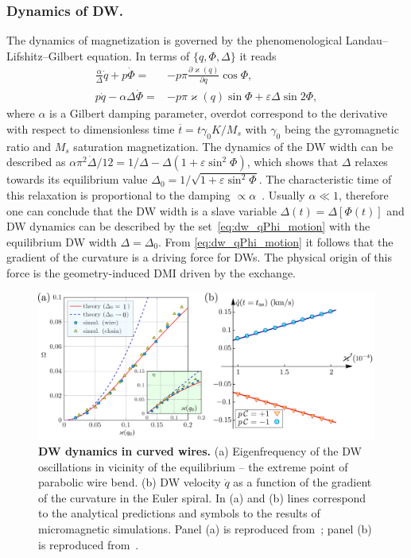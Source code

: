 \documentclass[runningheads]{llncs}
\begin{document}
\subsubsection{Dynamics of DW.} The dynamics of magnetization is governed by the phenomenological Landau--Lifshitz--Gilbert equation. In terms of $\{q,\Phi,\Delta\}$ it reads~\cite{Yershov15b,Yershov18a}
\begin{equation}\label{eq:dw_qPhi_motion}
\begin{split}
\frac{\alpha}{\Delta}\dot{q}+p\dot{\Phi} = &-p\pi\frac{\partial\varkappa(q)}{\partial q}\cos\Phi,\\
p\dot{q}-\alpha\Delta\dot{\Phi} = &-p\pi\varkappa(q)\sin\Phi+\varepsilon\Delta\sin 2\Phi,
\end{split}
\end{equation}
where $\alpha$ is a Gilbert damping parameter, overdot correspond to the derivative with respect to dimensionless time $\overline{t}=t\gamma_0K/M_s$ with $\gamma_0$ being the gyromagnetic ratio and $M_s$ saturation magnetization.
The dynamics of the DW width can be described as $\alpha\pi^2\dot{\Delta}/12=1/\Delta-\Delta\left(1+\varepsilon\sin^2\Phi\right)$, which shows that $\Delta$ relaxes towards its equilibrium value $\Delta_0=1/\sqrt{1+\varepsilon\sin^2\Phi}$. The characteristic time of this relaxation is proportional to the damping $\propto \alpha$~\cite{Hillebrands06}. Usually $\alpha\ll1$, therefore one can conclude that the DW width is a slave variable $\Delta(t) = \Delta[\Phi(t)]$ and DW dynamics can be described by the set~\eqref{eq:dw_qPhi_motion}  with the equilibrium DW width $\Delta=\Delta_0$. From \eqref{eq:dw_qPhi_motion} it follows that the gradient of the curvature is a driving force for DWs. The physical origin of this force is the geometry-induced DMI driven by the exchange.

\begin{figure}[t]
	\includegraphics[width=\textwidth]{fig_dw_dynamics_curved}
	\caption{\label{fig:dw_wire_2}%
		\textbf{DW dynamics in curved wires.} (a) Eigenfrequency of the DW oscillations in vicinity of the equilibrium -- the extreme point of parabolic wire bend. (b) DW velocity $\dot{q}$ as a function of the gradient of the curvature in the Euler spiral. In (a) and (b)  lines correspond to the analytical predictions and symbols to the results of micromagnetic simulations. Panel (a) is reproduced from~\cite{Yershov15b}; panel (b) is reproduced from~\cite{Yershov18a}.}
\end{figure}
\end{document}
